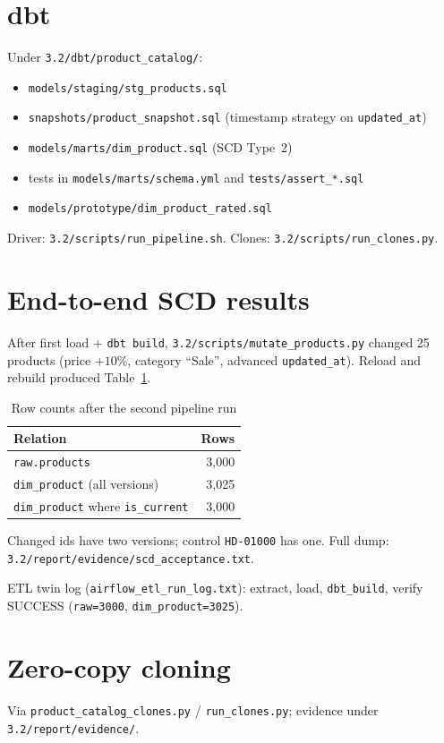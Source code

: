 \documentclass[conference]{IEEEtran}
\begin{document}
\section{dbt}
Under \texttt{3.2/dbt/product\_catalog/}:
\begin{itemize}[leftmargin=*,itemsep=1pt]
  \item \texttt{models/staging/stg\_products.sql}
  \item \texttt{snapshots/product\_snapshot.sql}
        (timestamp strategy on \texttt{updated\_at})
  \item \texttt{models/marts/dim\_product.sql} (SCD Type~2)
  \item tests in \texttt{models/marts/schema.yml} and
        \texttt{tests/assert\_*.sql}
  \item \texttt{models/prototype/dim\_product\_rated.sql}
\end{itemize}
Driver: \texttt{3.2/scripts/run\_pipeline.sh}.
Clones: \texttt{3.2/scripts/run\_clones.py}.

\section{End-to-end SCD results}
After first load + \texttt{dbt build},
\texttt{3.2/scripts/mutate\_products.py} changed 25 products
(price $+10\%$, category ``Sale'', advanced \texttt{updated\_at}).
Reload and rebuild produced Table~\ref{tab:counts}.

\begin{table}[htbp]
\caption{Row counts after the second pipeline run}
\label{tab:counts}
\centering
\begin{tabular}{@{}lr@{}}
\toprule
Relation & Rows \\
\midrule
\texttt{raw.products} & 3{,}000 \\
\texttt{dim\_product} (all versions) & 3{,}025 \\
\texttt{dim\_product} where \texttt{is\_current} & 3{,}000 \\
\bottomrule
\end{tabular}
\end{table}

Changed ids have two versions; control \texttt{HD-01000} has one.
Full dump: \texttt{3.2/report/evidence/scd\_acceptance.txt}.

ETL twin log (\texttt{airflow\_etl\_run\_log.txt}):
extract, load, \texttt{dbt\_build}, verify SUCCESS
(\texttt{raw=3000}, \texttt{dim\_product=3025}).

\section{Zero-copy cloning}
Via \texttt{product\_catalog\_clones.py} /
\texttt{run\_clones.py}; evidence under
\texttt{3.2/report/evidence/}.
\end{document}
